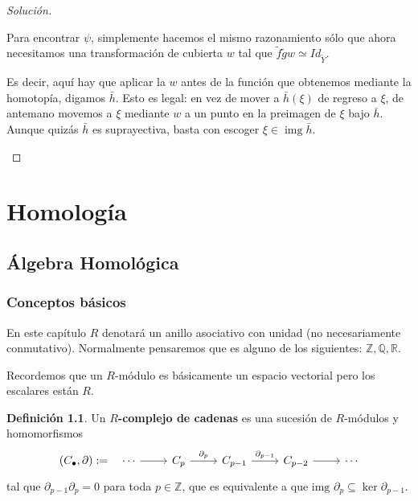 \documentclass[spanish]{book}
\theoremstyle{definition}
\newtheorem*{defn}{Definición}
\newcommand{\R}{\mathbb{R}}
\newcommand{\Z}{\mathbb{Z}}
\newcommand{\Q}{\mathbb{Q}}
\DeclareMathOperator{\img}{img}
\begin{document}
\begin{proof}[Solución]
\begin{enumerate}
		Para encontrar $\psi$, simplemente hacemos el mismo razonamiento sólo que ahora necesitamos una transformación de cubierta $w$ tal que $\tilde{f}\tilde{g}w\simeq Id_{\tilde{Y}}$.
		
		Es decir, aquí hay que aplicar la $w$ antes de la función que obtenemos mediante la homotopía, digamos $\bar{h}$. Esto es legal: en vez de mover a $\bar{h}(\xi)$ de regreso a $\xi$, de antemano movemos a $\xi$ mediante $w$ a un punto en la preimagen de $\xi$ bajo $\bar{h}$. Aunque quizás $\bar{h}$ es suprayectiva, basta con escoger $\xi\in\img\bar{h}$.
	\end{enumerate}
\end{proof}
\part{Homología}
\chapter{Álgebra Homológica}
\section{Conceptos básicos}
	En este capítulo $R$ denotará un anillo asociativo con unidad (no necesariamente conmutativo). Normalmente pensaremos que es alguno de los siguientes: $\Z, \Q, \R$.
	
	Recordemos que un $R$-módulo es básicamente un espacio vectorial pero los escalares están $R$.
	\begin{defn}
		Un \textbf{$R$-complejo de cadenas} es una sucesión de $R$-módulos y homomorfismos
		\[\begin{tikzcd}
			(C_\bullet,\partial):= \quad \cdots \arrow{r} & C_p \arrow{r}{\partial_p} & C_{p-1} \arrow{r}{\partial_{p-1}} & C_{p-2} \arrow{r} & \cdots
		\end{tikzcd}\]
		tal que $\partial_{p-1}\partial_p=0$ para toda $p\in \mathbb{Z}$, que es equivalente a que $\text{img }\partial_p\subseteq\ker{\partial_{p-1}}$.
	\end{defn}
	
\end{document}
